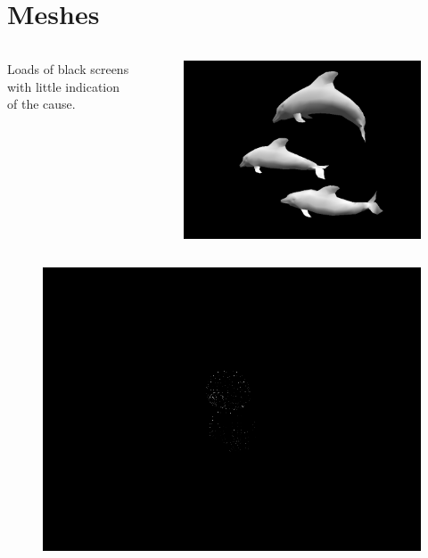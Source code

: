 \documentclass{beamer}
\begin{document}
\section{Meshes}
\begin{frame}
	\begin{columns}[T]
		\begin{column}{.45\textwidth}
			Loads of black screens with little indication of the cause.
		\end{column}
		\begin{column}{.45\textwidth}
			\begin{figure}
				\includegraphics[width=\textwidth]{dolphins.png}
			\end{figure}
		\end{column}
	\end{columns}
\end{frame}

\begin{frame}
	\begin{columns}[T]
		\begin{column}{.45\textwidth}
			\begin{figure}
				\includegraphics[width=\textwidth]{teddy.png}
			\end{figure}
		\end{column}
	\end{columns}
\end{frame}
\end{document}
